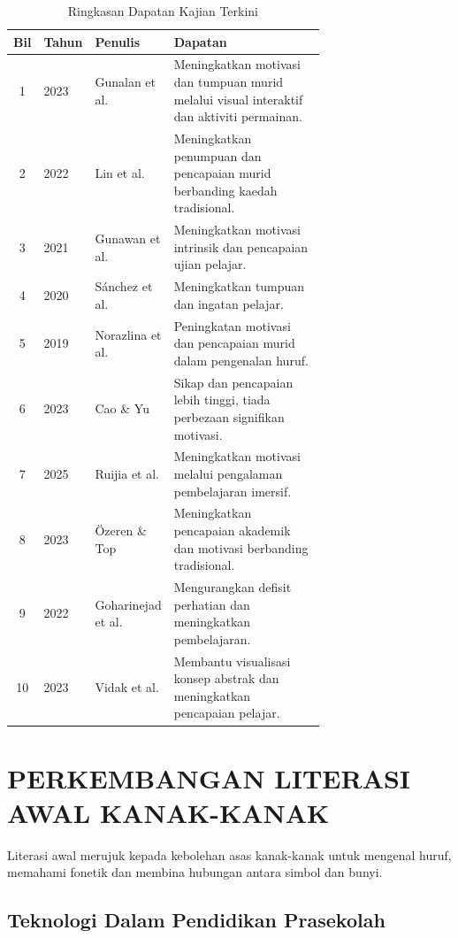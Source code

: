 \begin{table}[ht]
    \centering
    \caption{Ringkasan Dapatan Kajian Terkini}
    \begin{tabular}{cl>{\raggedright\arraybackslash}p{0.16\linewidth}>{\raggedright\arraybackslash}p{0.54\linewidth}}
        \toprule
        Bil & Tahun & Penulis & Dapatan \\
        \midrule
        1 & 2023 & Gunalan et al. & Meningkatkan motivasi dan tumpuan murid melalui visual interaktif dan aktiviti permainan. \\
        2 & 2022 & Lin et al. & Meningkatkan penumpuan dan pencapaian murid berbanding kaedah tradisional. \\
        3 & 2021 & Gunawan et al. & Meningkatkan motivasi intrinsik dan pencapaian ujian pelajar. \\
        4 & 2020 & Sánchez et al. & Meningkatkan tumpuan dan ingatan pelajar. \\
        5 & 2019 & Norazlina et al. & Peningkatan motivasi dan pencapaian murid dalam pengenalan huruf. \\
        6 & 2023 & Cao \& Yu & Sikap dan pencapaian lebih tinggi, tiada perbezaan signifikan motivasi. \\
        7 & 2025 & Ruijia et al. & Meningkatkan motivasi melalui pengalaman pembelajaran imersif. \\
        8 & 2023 & Özeren \& Top & Meningkatkan pencapaian akademik dan motivasi berbanding tradisional. \\
        9 & 2022 & Goharinejad et al. & Mengurangkan defisit perhatian dan meningkatkan pembelajaran. \\
        10 & 2023 & Vidak et al. & Membantu visualisasi konsep abstrak dan meningkatkan pencapaian pelajar. \\
        \bottomrule
    \end{tabular}
\end{table}

\section{\textbf{PERKEMBANGAN LITERASI AWAL KANAK-KANAK}}

Literasi awal merujuk kepada kebolehan asas kanak-kanak untuk mengenal huruf, memahami fonetik dan membina hubungan antara simbol dan bunyi.

\subsection{ Teknologi Dalam Pendidikan Prasekolah}

